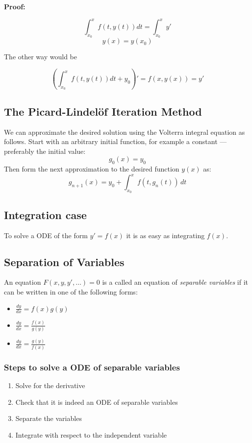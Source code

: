 \textbf{Proof:}

\[\int_{x_0}^{x} f(t, y(t))dt = \int_{x_0}^{x} y'\]
\[y(x) = y(x_0)\]

The other way would be

\[\left(\int_{x_0}^{x} f(t, y(t))dt + y_0\right)' = f(x, y(x)) = y' \]

\QED

\subsection{The Picard-Lindelöf Iteration Method}

We can approximate the desired solution using the Volterra integral equation as follows. Start with an arbitrary initial function, for example a constant — preferably the initial value:
\[
g_0(x) = y_0
\]
Then form the next approximation to the desired function \( y(x) \) as:
\[
g_{n+1}(x) = y_0 + \int_{x_0}^{x} f(t, g_n(t)) \, dt
\]

\subsection{Integration case}

To solve a ODE of the form \(y' = f(x)\) it is as easy as integrating \(f(x)\).

\subsection{Separation of Variables}

An equation \(F(x,y,y',\dots) = 0\) is a called an equation of \emph{separable variables} if it can
be written in one of the following forms:

\begin{itemize}[label=\(-\)]
    \item \(\frac{dy}{dx} = f(x) g(y)\)
    \item \(\frac{dy}{dx} = \frac{f(x)}{g(y)}\)
     \item \(\frac{dy}{dx} = \frac{g(y)}{f(x)}\)
\end{itemize}

\subsubsection{Steps to solve a ODE of separable variables}

\begin{enumerate}
    \item Solve for the derivative
    \item Check that it is indeed an ODE of separable variables
    \item Separate the variables
    \item Integrate with respect to the independent variable
\end{enumerate}

